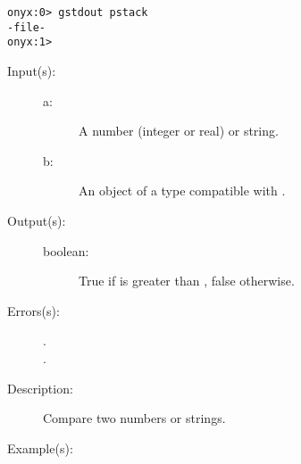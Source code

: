 \begin{description}
\begin{description}
\begin{verbatim}
onyx:0> gstdout pstack
-file-
onyx:1>
		\end{verbatim}
	\end{description}
\label{systemdict:gt}
\item[{\onyxop{a b}{gt}{boolean}}: ]
	\begin{description}\item[]
	\item[Input(s): ]
		\begin{description}\item[]
		\item[a: ]
			A number (integer or real) or string.
		\item[b: ]
			An object of a type compatible with .
		\end{description}
	\item[Output(s): ]
		\begin{description}\item[]
		\item[boolean: ]
			True if  is greater than , false
			otherwise.
		\end{description}
	\item[Errors(s): ]
		\begin{description}\item[]
		\item[.]
		\item[.]
		\end{description}
	\item[Description: ]
		Compare two numbers or strings.
	\item[Example(s): ]\begin{verbatim}


\end{verbatim}
\end{description}
\end{description}
